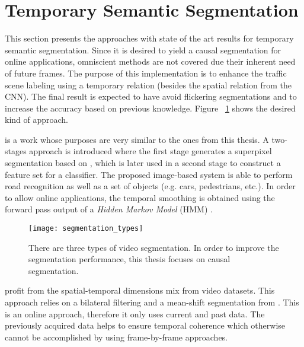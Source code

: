 \section{Temporary Semantic Segmentation}
\label{sec:tempsemseg}
This section presents the approaches with state of the art results for temporary semantic segmentation. Since it is desired to yield a causal segmentation for online applications, omniscient methods are not covered due their inherent need of future frames. The purpose of this implementation is to enhance the traffic scene labeling using a temporary relation (besides the spatial relation from the CNN). The final result is expected to have avoid flickering segmentations and to increase the accuracy based on previous knowledge. Figure ~\ref{fig:causal} shows the desired kind of approach. %

 
\textcite{ess2009segmentation} is a work whose purposes are very similar to the ones from this thesis. A two-stages approach is introduced where the first stage generates a superpixel segmentation based on \textcite{felzenszwalb2004efficient}, which is later used in a second stage to construct a feature set for a classifier. The proposed image-based system is able to perform road recognition as well as a set of objects (e.g. cars, pedestrians, etc.). In order to allow online applications, the temporal smoothing is obtained using the forward pass output of a \textit{Hidden Markov Model} (HMM) \textcite{rabiner1989tutorial}.

\begin{figure}
 \centering
 \texttt{[image: segmentation\_types]}
 \caption{There are three types of video segmentation. In order to improve the segmentation performance, this thesis focuses on causal segmentation.}
  \label{fig:causal}
\end{figure} 

\textcite{paris2008edge} profit from the spatial-temporal dimensions mix from video datasets. This approach relies on a bilateral filtering and a mean-shift segmentation from \textcite{paris2007topological}. This is an online approach, therefore it only uses current and past data. The previously acquired data helps to ensure temporal coherence which otherwise cannot be accomplished by using frame-by-frame approaches.

